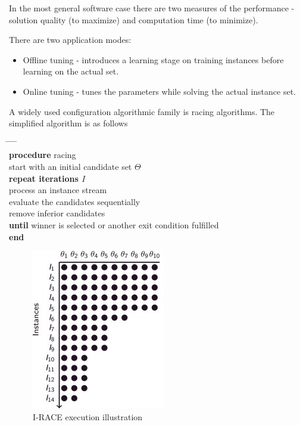 \documentclass[12pt]{article}
\begin{document}
In the most general software case there are two measures of the performance - solution quality (to maximize) and computation time (to minimize).

There are two application modes:
\begin{itemize}
\item Offline tuning - introduces a learning stage on training instances before learning on the actual set.
\item Online tuning - tunes the parameters while solving the actual instance set.
\end{itemize}

A widely used configuration algorithmic family is racing algorithms. The simplified algorithm is as follows

\begin{algorithm}
\begin{tabbing}
\hspace*{1cm} \= \hspace*{1cm} \= \hspace*{1cm} \= \hspace*{1cm} \= \hspace*{1cm} \= \\
\textbf{procedure} racing \\
\> start with an initial candidate set $\Theta$ \\
\> \textbf{repeat iterations $I$} \\
\> \> process an instance stream \\
\> \> evaluate the candidates sequentially \\
\> \> remove inferior candidates \\
\> \textbf{until} winner is selected or another exit condition fulfilled \\
\textbf{end}
\end{tabbing}
\end{algorithm}



\begin{figure}[htbp!]
  \centering
    \includegraphics[scale=1.2]{irace.jpg}
  \caption{I-RACE execution illustration}
  \label{fig:irace}
\end{figure}
\end{document}
